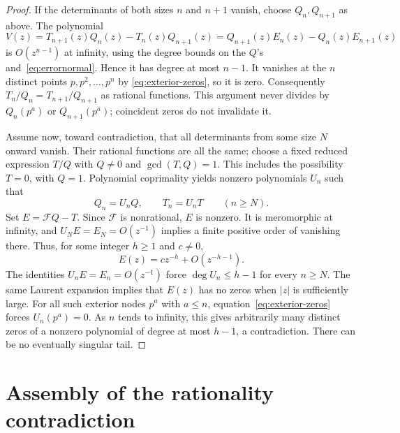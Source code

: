 \documentclass[11pt,letterpaper]{article}
\numberwithin{equation}{section}
\theoremstyle{remark}
\begin{document}
\begin{proof}
If the determinants of both sizes $n$ and $n+1$ vanish, choose $Q_n,Q_{n+1}$ as above. The polynomial
\begin{equation*}
 V(z)=T_{n+1}(z)Q_n(z)-T_n(z)Q_{n+1}(z)
     =Q_{n+1}(z)E_n(z)-Q_n(z)E_{n+1}(z)
\end{equation*}
is $O(z^{n-1})$ at infinity, using the degree bounds on the $Q$'s and~\eqref{eq:errornormal}. Hence it has degree at most $n-1$. It vanishes at the $n$ distinct points $p,p^2,\ldots,p^n$ by
\eqref{eq:exterior-zeros}, so it is zero. Consequently
$T_n/Q_n=T_{n+1}/Q_{n+1}$ as rational functions. This argument never divides by $Q_n(p^a)$ or $Q_{n+1}(p^a)$; coincident zeros do not invalidate it.

Assume now, toward contradiction, that all determinants from some size $N$ onward vanish. Their rational functions are all the same; choose a fixed reduced expression $T/Q$ with $Q\ne0$ and $\gcd(T,Q)=1$. This includes the possibility $T=0$, with $Q=1$. Polynomial coprimality yields nonzero polynomials $U_n$ such that
\begin{equation*}
 Q_n=U_nQ,\qquad T_n=U_nT\qquad(n\ge N).
\end{equation*}
Set $E=\mathcal FQ-T$. Since $\mathcal F$ is nonrational, $E$ is nonzero. It is meromorphic at infinity, and $U_NE=E_N=O(z^{-1})$ implies a finite positive order of vanishing there. Thus, for some integer $h\ge1$ and $c\ne0$,
\begin{equation*}
 E(z)=cz^{-h}+O(z^{-h-1}).
\end{equation*}
The identities $U_nE=E_n=O(z^{-1})$ force $\deg U_n\le h-1$ for every $n\ge N$. The same Laurent expansion implies that $E(z)$ has no zeros when $|z|$ is sufficiently large. For all such exterior nodes $p^a$ with $a\le n$, equation~\eqref{eq:exterior-zeros} forces $U_n(p^a)=0$. As $n$ tends to infinity, this gives arbitrarily many distinct zeros of a nonzero polynomial of degree at most $h-1$, a contradiction. There can be no eventually singular tail.
\end{proof}

\section{Assembly of the rationality contradiction}
\end{document}
